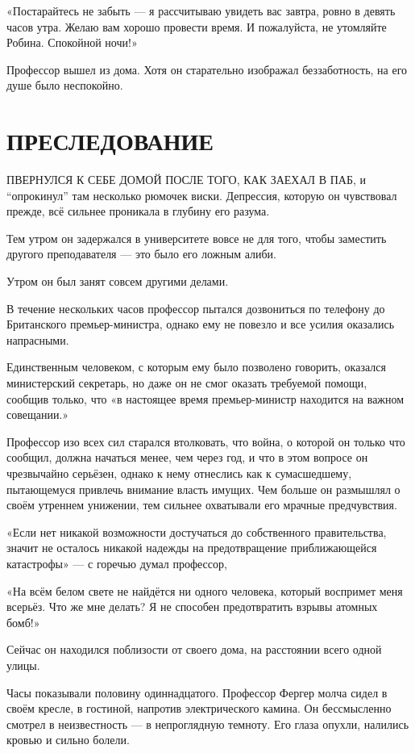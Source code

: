 \documentclass[a5paper, 9pt,
final, openany, twoside=true]{memoir}
\begin{document}
«Постарайтесь не забыть — я рассчитываю увидеть вас завтра, ровно в девять часов утра. Желаю вам хорошо провести время. И пожалуйста, не утомляйте Робина. Спокойной ночи!»

Профессор вышел из дома. Хотя он старательно изображал беззаботность, на его душе было неспокойно.
\chapter{ПРЕСЛЕДОВАНИЕ}
П{ ВЕРНУЛСЯ К СЕБЕ ДОМОЙ ПОСЛЕ ТОГО, КАК ЗАЕХАЛ В ПАБ}, и ``опрокинул'' там несколько рюмочек виски. Депрессия, которую он чувствовал прежде, всё сильнее проникала в глубину его разума.

Тем утром он задержался в университете вовсе не для того, чтобы заместить другого преподавателя — это было его ложным алиби.

Утром он был занят совсем другими делами.

В течение нескольких часов профессор пытался дозвониться по телефону до Британского премьер-министра, однако ему не повезло и все усилия оказались напрасными.

Единственным человеком, с которым ему было позволено говорить, оказался министерский секретарь, но даже он не смог оказать требуемой помощи, сообщив только, что «в настоящее время премьер-министр находится на важном совещании.»

Профессор изо всех сил старался втолковать, что война, о которой он только что сообщил, должна начаться менее, чем через год, и что в этом вопросе он чрезвычайно серьёзен, однако к нему отнеслись как к сумасшедшему, пытающемуся привлечь внимание власть имущих. Чем больше он размышлял о своём утреннем унижении, тем сильнее охватывали его мрачные предчувствия.

«Если нет никакой возможности достучаться до собственного правительства, значит не осталось никакой надежды на предотвращение приближающейся катастрофы» — с горечью думал профессор,

«На всём белом свете не найдётся ни одного человека, который воспримет меня всерьёз. Что же мне делать? Я не способен предотвратить взрывы атомных бомб!»

Сейчас он находился поблизости от своего дома, на расстоянии всего одной улицы.\bigskip

Часы показывали половину одиннадцатого. Профессор Фергер молча сидел в своём кресле, в гостиной, напротив электрического камина. Он бессмысленно смотрел в неизвестность — в непроглядную темноту. Его глаза опухли, налились кровью и сильно болели.
\end{document}
